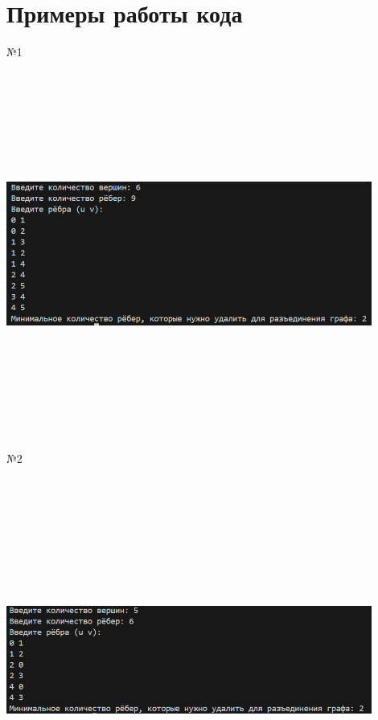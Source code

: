 \documentclass[12pt]{article}
\begin{document}
\section*{Примеры работы кода}
\par №1
 \par\includegraphics[width=0.9\textwidth, height=12cm, keepaspectratio]{res1.png}
\par №2
 \par\includegraphics[width=0.9\textwidth, height=12cm, keepaspectratio]{res2.png}
\end{document}
